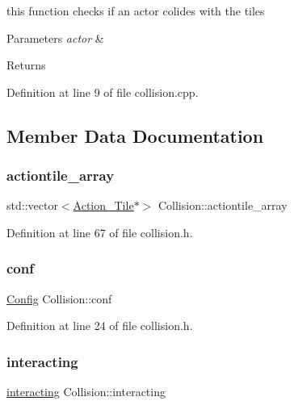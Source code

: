 this function checks if an actor colides with the tiles 
\begin{DoxyParams}{Parameters}
{\em actor} & \\
\hline
\end{DoxyParams}
\begin{DoxyReturn}{Returns}

\end{DoxyReturn}


Definition at line 9 of file collision.\+cpp.



\subsection{Member Data Documentation}
\hypertarget{class_collision_a4faba0ed139ab4f637fe57b7d654ae65}{}\label{class_collision_a4faba0ed139ab4f637fe57b7d654ae65} 
\subsubsection{\texorpdfstring{actiontile\+\_\+array}{actiontile\_array}}
{\footnotesize\ttfamily std\+::vector$<$\hyperlink{class_action___tile}{Action\+\_\+\+Tile}$\ast$$>$ Collision\+::actiontile\+\_\+array}



Definition at line 67 of file collision.\+h.

\hypertarget{class_collision_a1c9e4741260ced02eab1c9d49dc20aac}{}\label{class_collision_a1c9e4741260ced02eab1c9d49dc20aac} 
\subsubsection{\texorpdfstring{conf}{conf}}
{\footnotesize\ttfamily \hyperlink{class_config}{Config} Collision\+::conf}



Definition at line 24 of file collision.\+h.

\hypertarget{class_collision_a6ff0e49847948afeb0be0a1e5ded45c9}{}\label{class_collision_a6ff0e49847948afeb0be0a1e5ded45c9} 
\subsubsection{\texorpdfstring{interacting}{interacting}}
{\footnotesize\ttfamily \hyperlink{classinteracting}{interacting} Collision\+::interacting}



